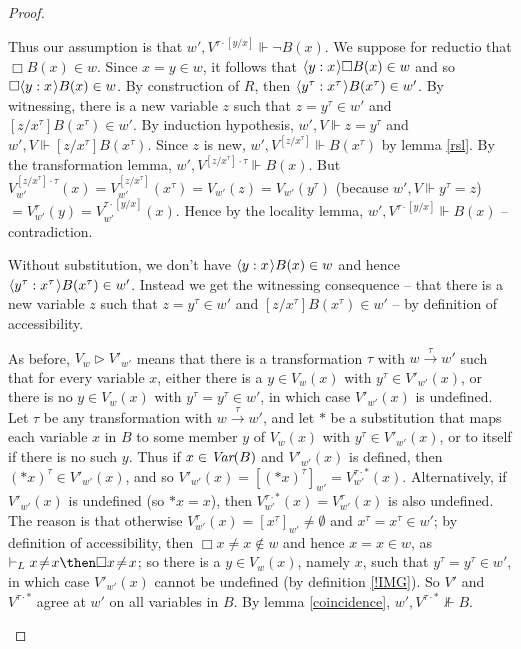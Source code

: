 \documentclass[11pt]{woarticle}
\theoremstyle{break}
\theoremstyle{nonumberplain}
\newcommand{\SAT}{\Vdash}
\newcommand{\Img}{\triangleright}
\newcommand{\1}{\;\,|\;\,}
\newcommand{\var}{\emph{Var}}
\renewcommand{\t}[1]{\ensuremath{\langle #1  \makebox[.2ex]{}\rangle}}
\begin{document}
\begin{proof}
\begin{enumerate}
{      Thus our assumption is that $w',V^{\tau\cdot [y/x]} \SAT \neg
      B(x)$. We suppose for reductio that $\Box B(x) \in w$. Since
      $x\!=\!y\in w$, it follows that $\t{y:x}\Box B(x) \in w$ and so
      $\Box \t{y:x} B(x) \in w$. By construction of $R$, then
      $\t{y^\tau: x^\tau}B(x^\tau) \in w'$. By witnessing, there is a
      new variable $z$ such that $z\!=\!y^\tau \in w'$ and
      $[z/x^\tau]B(x^\tau) \in w'$. By induction hypothesis, $w',V
      \SAT z\!=\!y^\tau$ and $w',V \SAT [z/x^\tau]B(x^\tau)$. Since
      $z$ is new, $w',V^{[z/x^\tau]} \SAT B(x^\tau)$ by lemma
      \ref{rsl}. By the transformation lemma, $w',V^{[z/x^\tau]\cdot
        \tau} \SAT B(x)$.  But $V^{[z/x^\tau]\cdot\tau}_{w'}(x) =
      V^{[z/x^\tau]}_{w'}(x^\tau) = V_{w'}(z) = V_{w'}(y^\tau)$ (because
      $w',V \SAT y^\tau\!=\!z$) $ = V_{w'}^\tau(y) =
      V_{w'}^{\tau\cdot[y/x]}(x)$. Hence by the locality lemma,
      $w',V^{\tau\cdot[y/x]} \SAT B(x)$ -- contradiction.

      Without substitution, we don't have $\t{y:x}B(x) \in w$ and
      hence $\t{y^\tau: x^\tau}B(x^\tau) \in w'$. Instead we get the
      witnessing consequence -- that there is a new variable $z$ such
      that $z\!=\!y^\tau \in w'$ and $[z/x^\tau]B(x^\tau) \in w'$ --
      by definition of accessibility.

    } %
    As before, $V_w \Img V'_{w'}$ means that there is a transformation
    $\tau$ with $w\xrightarrow{\tau}w'$ such that for every variable
    $x$, either there is a $y \in V_w(x)$ with $y^\tau \in
    V'_{w'}(x)$, or there is no $y\in V_w(x)$ with $y^\tau\!=\!y^\tau
    \in w'$, in which case $V'_{w'}(x)$ is undefined. Let $\tau$ be
    any transformation with $w\xrightarrow{\tau} w'$, and let $*$ be a
    substitution that maps each variable $x$ in $B$ to some member $y$
    of $V_w(x)$ with $y^\tau \in V'_{w'}(x)$, or to itself if there is
    no such $y$. Thus if $x \in \var(B)$ and $V'_{w'}(x)$ is defined,
    then $(*x)^\tau \in V'_{w'}(x)$, and so $V'_{w'}(x) =
    [(*x)^\tau]_{w'} = V^{\tau\cdot *}_{w'}(x)$. Alternatively, if
    $V'_{w'}(x)$ is undefined (so $*x=x$), then $V^{\tau\cdot
      *}_{w'}(x) = V^{\tau}_{w'}(x)$ is also undefined. The reason is
    that otherwise $V^{\tau}_{w'}(x) = [x^\tau]_{w'} \not= \emptyset$
    and $x^\tau\!=\!x^\tau \in w'$; by definition of accessibility,
    then $\Box x\!\not=\!x \not\in w$ and hence $x\!=\!x \in w$, as
    $\vdash_L x\!\not=\!x \then \Box x\!\not=\!x$; so there is a $y
    \in V_w(x)$, namely $x$, such that $y^\tau\!=\!y^\tau \in w'$, in
    which case $V'_{w'}(x)$ cannot be undefined (by definition
    \ref{!IMG}). So $V'$ and $V^{\tau\cdot *}$ agree at $w'$ on all
    variables in $B$. By lemma \ref{coincidence}, $w',V^{\tau\cdot *}
    \not\SAT B$.


\end{enumerate}
\end{proof}
\end{document}
